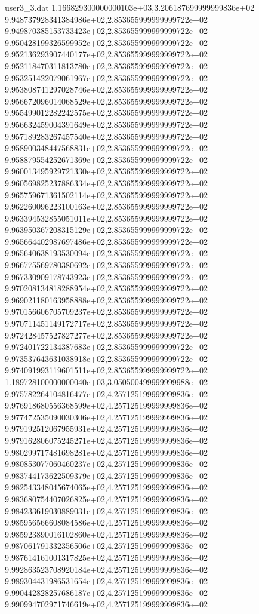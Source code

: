 \begin{filecontents}{user3_3.dat}
1.166829300000000103e+03,3.206187699999999836e+02
9.948737928341384986e+02,2.853655999999999722e+02
9.949870385153733423e+02,2.853655999999999722e+02
9.950428199326599952e+02,2.853655999999999722e+02
9.952136293907440177e+02,2.853655999999999722e+02
9.952118470311813780e+02,2.853655999999999722e+02
9.953251422079061967e+02,2.853655999999999722e+02
9.953808741297028746e+02,2.853655999999999722e+02
9.956672096014068529e+02,2.853655999999999722e+02
9.955499012282242575e+02,2.853655999999999722e+02
9.956632459004391649e+02,2.853655999999999722e+02
9.957189283267457540e+02,2.853655999999999722e+02
9.958900348447568831e+02,2.853655999999999722e+02
9.958879554252671369e+02,2.853655999999999722e+02
9.960013495929721330e+02,2.853655999999999722e+02
9.960569825237886334e+02,2.853655999999999722e+02
9.965759671361502114e+02,2.853655999999999722e+02
9.962260096223100163e+02,2.853655999999999722e+02
9.963394532855051011e+02,2.853655999999999722e+02
9.963950367208315129e+02,2.853655999999999722e+02
9.965664402987697486e+02,2.853655999999999722e+02
9.965640638193530094e+02,2.853655999999999722e+02
9.966775569780380692e+02,2.853655999999999722e+02
9.967330909178743923e+02,2.853655999999999722e+02
9.970208134818288954e+02,2.853655999999999722e+02
9.969021180163958888e+02,2.853655999999999722e+02
9.970156606705709237e+02,2.853655999999999722e+02
9.970711451149172717e+02,2.853655999999999722e+02
9.972428457527827277e+02,2.853655999999999722e+02
9.972401722134387683e+02,2.853655999999999722e+02
9.973537643631038918e+02,2.853655999999999722e+02
9.974091993119601511e+02,2.853655999999999722e+02
1.189728100000000040e+03,3.050500499999999988e+02
9.975782264104816477e+02,4.257125199999999836e+02
9.976918680556368599e+02,4.257125199999999836e+02
9.977472535090030306e+02,4.257125199999999836e+02
9.979192512067955931e+02,4.257125199999999836e+02
9.979162806075245271e+02,4.257125199999999836e+02
9.980299717481698281e+02,4.257125199999999836e+02
9.980853077060460237e+02,4.257125199999999836e+02
9.983744173622509379e+02,4.257125199999999836e+02
9.982543348045674065e+02,4.257125199999999836e+02
9.983680754407026825e+02,4.257125199999999836e+02
9.984233619030889031e+02,4.257125199999999836e+02
9.985956566608084586e+02,4.257125199999999836e+02
9.985923890016102860e+02,4.257125199999999836e+02
9.987061791332356506e+02,4.257125199999999836e+02
9.987614161001317825e+02,4.257125199999999836e+02
9.992863523708920184e+02,4.257125199999999836e+02
9.989304431986531654e+02,4.257125199999999836e+02
9.990442828257686187e+02,4.257125199999999836e+02
9.990994702971746619e+02,4.257125199999999836e+02

\end{filecontents}
